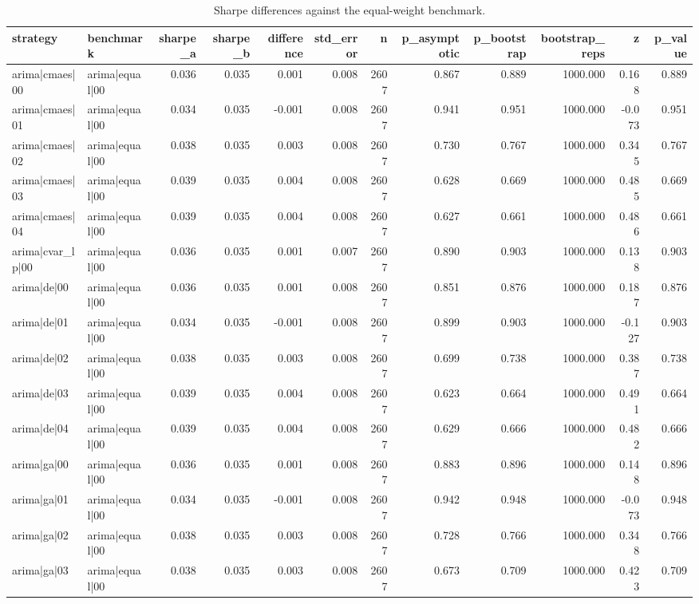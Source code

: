 \begin{table}
\caption{Sharpe differences against the equal-weight benchmark.}
\label{tab:sharpe_tests}
\begin{tabular}{llrrrrrrrrrr}
\toprule
strategy & benchmark & sharpe\_a & sharpe\_b & difference & std\_error & n & p\_asymptotic & p\_bootstrap & bootstrap\_reps & z & p\_value \\
\midrule
arima|cmaes|00 & arima|equal|00 & 0.036 & 0.035 & 0.001 & 0.008 & 2607 & 0.867 & 0.889 & 1000.000 & 0.168 & 0.889 \\
arima|cmaes|01 & arima|equal|00 & 0.034 & 0.035 & -0.001 & 0.008 & 2607 & 0.941 & 0.951 & 1000.000 & -0.073 & 0.951 \\
arima|cmaes|02 & arima|equal|00 & 0.038 & 0.035 & 0.003 & 0.008 & 2607 & 0.730 & 0.767 & 1000.000 & 0.345 & 0.767 \\
arima|cmaes|03 & arima|equal|00 & 0.039 & 0.035 & 0.004 & 0.008 & 2607 & 0.628 & 0.669 & 1000.000 & 0.485 & 0.669 \\
arima|cmaes|04 & arima|equal|00 & 0.039 & 0.035 & 0.004 & 0.008 & 2607 & 0.627 & 0.661 & 1000.000 & 0.486 & 0.661 \\
arima|cvar\_lp|00 & arima|equal|00 & 0.036 & 0.035 & 0.001 & 0.007 & 2607 & 0.890 & 0.903 & 1000.000 & 0.138 & 0.903 \\
arima|de|00 & arima|equal|00 & 0.036 & 0.035 & 0.001 & 0.008 & 2607 & 0.851 & 0.876 & 1000.000 & 0.187 & 0.876 \\
arima|de|01 & arima|equal|00 & 0.034 & 0.035 & -0.001 & 0.008 & 2607 & 0.899 & 0.903 & 1000.000 & -0.127 & 0.903 \\
arima|de|02 & arima|equal|00 & 0.038 & 0.035 & 0.003 & 0.008 & 2607 & 0.699 & 0.738 & 1000.000 & 0.387 & 0.738 \\
arima|de|03 & arima|equal|00 & 0.039 & 0.035 & 0.004 & 0.008 & 2607 & 0.623 & 0.664 & 1000.000 & 0.491 & 0.664 \\
arima|de|04 & arima|equal|00 & 0.039 & 0.035 & 0.004 & 0.008 & 2607 & 0.629 & 0.666 & 1000.000 & 0.482 & 0.666 \\
arima|ga|00 & arima|equal|00 & 0.036 & 0.035 & 0.001 & 0.008 & 2607 & 0.883 & 0.896 & 1000.000 & 0.148 & 0.896 \\
arima|ga|01 & arima|equal|00 & 0.034 & 0.035 & -0.001 & 0.008 & 2607 & 0.942 & 0.948 & 1000.000 & -0.073 & 0.948 \\
arima|ga|02 & arima|equal|00 & 0.038 & 0.035 & 0.003 & 0.008 & 2607 & 0.728 & 0.766 & 1000.000 & 0.348 & 0.766 \\
arima|ga|03 & arima|equal|00 & 0.038 & 0.035 & 0.003 & 0.008 & 2607 & 0.673 & 0.709 & 1000.000 & 0.423 & 0.709 \\

\end{tabular}
\end{table}
